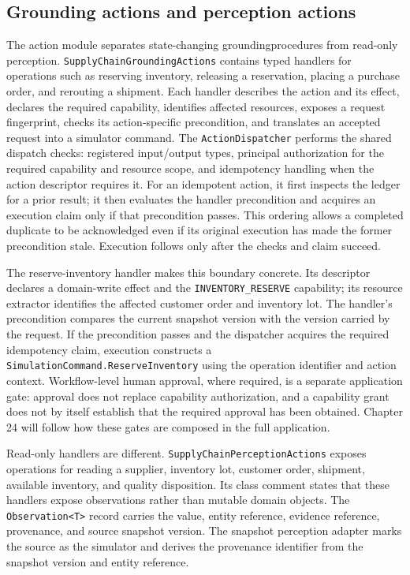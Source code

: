 \subsection{Grounding actions and perception actions}

The action module separates state-changing \gls{groundingprocedure}s from read-only perception. \texttt{SupplyChain\allowbreak{}GroundingActions} contains typed handlers for operations such as reserving inventory, releasing a reservation, placing a purchase order, and rerouting a shipment. Each handler describes the action and its effect, declares the required capability, identifies affected resources, exposes a request fingerprint, checks its action-specific precondition, and translates an accepted request into a simulator command. The \texttt{ActionDispatcher} performs the shared dispatch checks: registered input/output types, principal authorization for the required capability and resource scope, and idempotency handling when the action descriptor requires it. For an idempotent action, it first inspects the ledger for a prior result; it then evaluates the handler precondition and acquires an execution claim only if that precondition passes. This ordering allows a completed duplicate to be acknowledged even if its original execution has made the former precondition stale. Execution follows only after the checks and claim succeed.

The reserve-inventory handler makes this boundary concrete. Its descriptor declares a domain-write effect and the \texttt{INVENTORY\_RESERVE} capability; its resource extractor identifies the affected customer order and inventory lot. The handler's precondition compares the current snapshot version with the version carried by the request. If the precondition passes and the dispatcher acquires the required idempotency claim, execution constructs a \texttt{SimulationCommand.ReserveInventory} using the operation identifier and action context. Workflow-level human approval, where required, is a separate application gate: approval does not replace capability authorization, and a capability grant does not by itself establish that the required approval has been obtained. Chapter 24 will follow how these gates are composed in the full application.

Read-only handlers are different. \texttt{SupplyChainPerceptionActions} exposes operations for reading a supplier, inventory lot, customer order, shipment, available inventory, and quality disposition. Its class comment states that these handlers expose observations rather than mutable domain objects. The \texttt{Observation<T>} record carries the value, entity reference, evidence reference, provenance, and source snapshot version. The snapshot perception adapter marks the source as the simulator and derives the provenance identifier from the snapshot version and entity reference.

